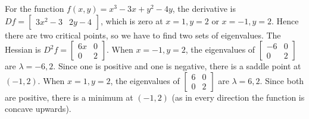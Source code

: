 

\begin{example}
For the function {$f(x,y)=x^3-3x+y^2-4y$}, the derivative is $Df = \begin{bmatrix}3x^2-3&2y-4 \end{bmatrix}$, which is zero at $x=1,y=2$ or $x=-1,y=2$. Hence there are two critical points, so we have to find two sets of eigenvalues. The Hessian is $D^2f = \begin{bmatrix}6x&0 \\0&2\end{bmatrix}$. When $x=-1,y=2$, the eigenvalues of $\begin{bmatrix}-6&0 \\0&2\end{bmatrix}$ are $\lambda=-6,2$. Since one is positive and one is negative, there is a saddle point at $(-1,2)$. When $x=1,y=2$, the eigenvalues of $\begin{bmatrix}6&0 \\0&2\end{bmatrix}$ are $\lambda=6,2$. Since both are positive, there is a minimum at $(-1,2)$ (as in every direction the function is concave upwards).


\end{example}
